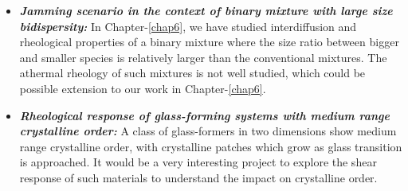 \begin{itemize}
    \item {\bf \em Jamming scenario in the context of binary mixture with large size bidispersity:} In Chapter-\ref{chap6}, we have studied interdiffusion and rheological properties of a binary mixture where the size ratio between bigger and smaller species is relatively larger than the conventional mixtures. The athermal rheology of such mixtures is not well studied, which could be possible extension to our work in Chapter-\ref{chap6}.
    
    \item {\bf \em Rheological response of glass-forming systems with medium range crystalline order:} A class of glass-formers in two dimensions show medium range crystalline order, with crystalline patches which grow as glass transition is approached. It would be a very interesting project to explore the shear response of such materials to understand the impact on crystalline order.
\end{itemize}
